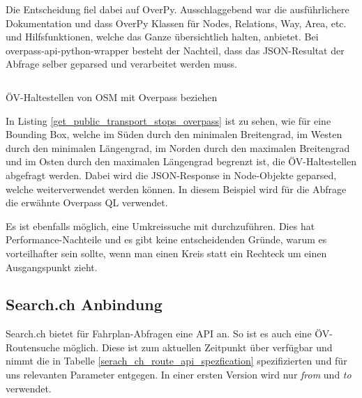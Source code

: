 Die Entscheidung fiel dabei auf OverPy. Ausschlaggebend war die ausführlichere Dokumentation und dass OverPy Klassen für Nodes, Relations, Way, Area, etc. und Hilfsfunktionen, welche das Ganze übersichtlich halten, anbietet. Bei overpass-api-python-wrapper besteht der Nachteil, dass das JSON-Resultat der Abfrage selber geparsed und verarbeitet werden muss.

\begin{listing}[ht]
    \inputminted{python}{projectdoc/listing/get_public_transport_stops_overpass.py}
    \caption{ÖV-Haltestellen von \acs{OSM} mit Overpass beziehen}
    \label{get_public_transport_stops_overpass}
\end{listing}

In Listing \ref{get_public_transport_stops_overpass} ist zu sehen, wie für eine Bounding Box, welche im Süden durch den minimalen Breitengrad, im Westen durch den minimalen Längengrad, im Norden durch den maximalen Breitengrad und im Osten durch den maximalen Längengrad begrenzt ist, die ÖV-Haltestellen abgefragt werden. Dabei wird die JSON-Response in Node-Objekte geparsed, welche weiterverwendet werden können. In diesem Beispiel wird für die Abfrage die erwähnte Overpass QL verwendet.

Es ist ebenfalls möglich, eine Umkreissuche mit  durchzuführen. Dies hat Performance-Nachteile und es gibt keine entscheidenden Gründe, warum es vorteilhafter sein sollte, wenn man einen Kreis statt ein Rechteck um einen Ausgangspunkt zieht.

\subsection{Search.ch Anbindung}
\label{analyse:Search.ch Anbindung}
Search.ch bietet für Fahrplan-Abfragen eine API\cite{search_ch_route_api} an. So ist es auch eine ÖV-Routensuche möglich. Diese ist zum aktuellen Zeitpunkt über  verfügbar und nimmt die in Tabelle \ref{serach_ch_route_api_spezfication} spezifizierten und für uns relevanten Parameter entgegen. In einer ersten Version wird nur \emph{from} und \emph{to} verwendet.

